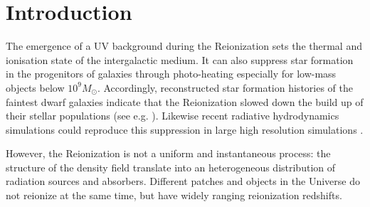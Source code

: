 \documentclass[twocolumn]{aastex61}
\begin{document}


\section{Introduction}
The emergence of a UV background during the Reionization sets the thermal and ionisation state of the intergalactic medium. It can also suppress star formation in the progenitors of galaxies through photo-heating especially for low-mass objects below $10^9 M_\odot$. Accordingly, reconstructed star formation histories of the faintest dwarf galaxies indicate that the Reionization slowed down the build up of their stellar populations (see e.g. \citet{BROWN14}). Likewise recent radiative hydrodynamics simulations could reproduce this suppression in large high resolution simulations \citep{OCV16}. 

However, the Reionization is not a uniform and instantaneous process: the structure of the density field translate into an heterogeneous distribution of radiation sources and absorbers. Different patches and objects in the Universe do not reionize at the same time, but have widely ranging reionization redshifts. 
\end{document}

